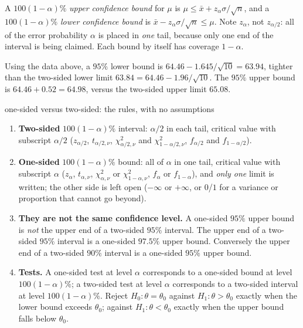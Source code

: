 \begin{definition}
A $100(1-\alpha)\%$ \emph{upper confidence bound} for $\mu$ is $\mu\le\bar{x}+z_\alpha\sigma/\sqrt n$, and a $100(1-\alpha)\%$ \emph{lower confidence bound} is $\bar{x}-z_\alpha\sigma/\sqrt n\le\mu$. Note $z_\alpha$, not $z_{\alpha/2}$: all of the error probability $\alpha$ is placed in \emph{one} tail, because only one end of the interval is being claimed. Each bound by itself has coverage $1-\alpha$.
\end{definition}

\begin{example}
Using the data above, a $95\%$ lower bound is $64.46-1.645/\sqrt{10}=63.94$, tighter than the two-sided lower limit $63.84=64.46-1.96/\sqrt{10}$. The $95\%$ upper bound is $64.46+0.52=64.98$, versus the two-sided upper limit $65.08$.
\end{example}

\begin{nuance}{one-sided versus two-sided: the rules, with no assumptions}
\begin{enumerate}
  \item \textbf{Two-sided} $100(1-\alpha)\%$ interval: $\alpha/2$ in each tail, critical value with subscript $\alpha/2$ ($z_{\alpha/2}$, $t_{\alpha/2,\nu}$, $\chi^2_{\alpha/2,\nu}$ and $\chi^2_{1-\alpha/2,\nu}$, $f_{\alpha/2}$ and $f_{1-\alpha/2}$).
  \item \textbf{One-sided} $100(1-\alpha)\%$ bound: all of $\alpha$ in one tail, critical value with subscript $\alpha$ ($z_\alpha$, $t_{\alpha,\nu}$, $\chi^2_{\alpha,\nu}$ or $\chi^2_{1-\alpha,\nu}$, $f_\alpha$ or $f_{1-\alpha}$), and \emph{only one} limit is written; the other side is left open ($-\infty$ or $+\infty$, or $0$/$1$ for a variance or proportion that cannot go beyond).
  \item \textbf{They are not the same confidence level.} A one-sided $95\%$ upper bound is \emph{not} the upper end of a two-sided $95\%$ interval. The upper end of a two-sided $95\%$ interval is a one-sided $97.5\%$ upper bound. Conversely the upper end of a two-sided $90\%$ interval is a one-sided $95\%$ upper bound.
  \item \textbf{Tests.} A one-sided test at level $\alpha$ corresponds to a one-sided bound at level $100(1-\alpha)\%$; a two-sided test at level $\alpha$ corresponds to a two-sided interval at level $100(1-\alpha)\%$. Reject $H_0:\theta=\theta_0$ against $H_1:\theta>\theta_0$ exactly when the lower bound exceeds $\theta_0$; against $H_1:\theta<\theta_0$ exactly when the upper bound falls below $\theta_0$.
\end{enumerate}
\end{nuance}

